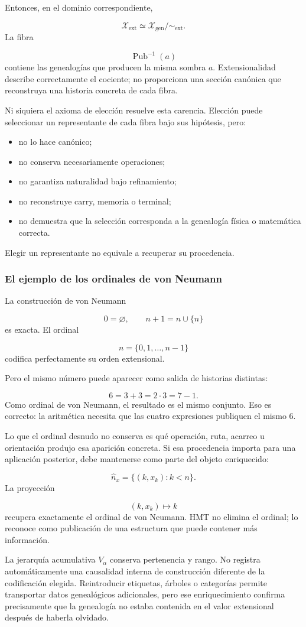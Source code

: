 Entonces, en el dominio correspondiente,\par
\[
\mathscr X_{\mathrm{ext}}
\simeq
\mathscr X_{\mathrm{gen}}/
{\sim_{\mathrm{ext}}}.
\]
La fibra\par
\[
\operatorname{Pub}^{-1}(a)
\]
contiene las genealogías que producen la misma sombra \(a\). Extensionalidad describe correctamente el cociente; no proporciona una sección canónica que reconstruya una historia concreta de cada fibra.\par
Ni siquiera el axioma de elección resuelve esta carencia. Elección puede seleccionar un representante de cada fibra bajo sus hipótesis, pero:\par
\begin{itemize}
\item no lo hace canónico;
\item no conserva necesariamente operaciones;
\item no garantiza naturalidad bajo refinamiento;
\item no reconstruye carry, memoria o terminal;
\item no demuestra que la selección corresponda a la genealogía física o matemática correcta.
\end{itemize}
Elegir un representante no equivale a recuperar su procedencia.\par
{}
\subsubsection{El ejemplo de los ordinales de von Neumann}
La construcción de von Neumann\par
\[
0=\varnothing,
\qquad
n+1=n\cup\{n\}
\]
es exacta. El ordinal\par
\[
n=\{0,1,\ldots,n-1\}
\]
codifica perfectamente su orden extensional.\par
{}
Pero el mismo número puede aparecer como salida de historias distintas:\par
\[
6=3+3=2\cdot3=7-1.
\]
Como ordinal de von Neumann, el resultado es el mismo conjunto. Eso es correcto: la aritmética necesita que las cuatro expresiones publiquen el mismo \(6\).\par
Lo que el ordinal desnudo no conserva es qué operación, ruta, acarreo u orientación produjo esa aparición concreta. Si esa procedencia importa para una aplicación posterior, debe mantenerse como parte del objeto enriquecido:\par
\[
\widehat n_x
=
\{(k,x_k):k<n\}.
\]
La proyección\par
\[
(k,x_k)\longmapsto k
\]
recupera exactamente el ordinal de von Neumann. HMT no elimina el ordinal; lo reconoce como publicación de una estructura que puede contener más información.\par
La jerarquía acumulativa \(V_\alpha\) conserva pertenencia y rango. No registra automáticamente una causalidad interna de construcción diferente de la codificación elegida. Reintroducir etiquetas, árboles o categorías permite transportar datos genealógicos adicionales, pero ese enriquecimiento confirma precisamente que la genealogía no estaba contenida en el valor extensional después de haberla olvidado.\par
{}
